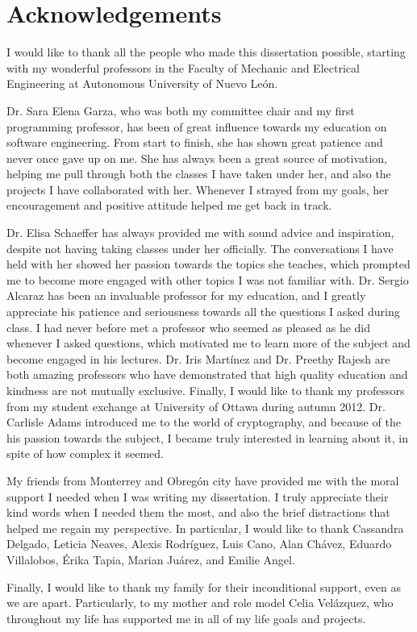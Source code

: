 \chapter*{Acknowledgements}

I would like to thank all the people who made this dissertation possible, starting with my wonderful professors in the Faculty of Mechanic and Electrical Engineering at Autonomous University of Nuevo Le\'{o}n. 

Dr. Sara Elena Garza, who was both my committee chair and my first programming professor, has been of great influence towards my education on software engineering. From start to finish, she has shown great patience and never once gave up on me. She has always been a great source of motivation, helping me pull through both the classes I have taken under her, and also the projects I have collaborated with her. Whenever I strayed from my goals, her encouragement and positive attitude helped me get back in track. 

Dr. Elisa Schaeffer has always provided me with sound advice and inspiration, despite not having taking classes under her officially. The conversations I have held with her showed her passion towards the topics she teaches, which prompted me to become more engaged with other topics I was not familiar with. Dr. Sergio Alcaraz has been an invaluable professor for my education, and I greatly appreciate his patience and seriousness towards all the questions I asked during class. I had never before met a professor who seemed as pleased as he did whenever I asked questions, which motivated me to learn more of the subject and become engaged in his lectures. Dr. Iris Mart\'{i}nez and Dr. Preethy Rajesh are both amazing professors who have demonstrated that high quality education and kindness are not mutually exclusive. Finally, I would like to thank my professors from my student exchange at University of Ottawa during autumn 2012. Dr. Carlisle Adams introduced me to the world of cryptography, and because of the his passion towards the subject, I became truly interested in learning about it, in spite of how complex it seemed.

My friends from Monterrey and Obreg\'{o}n city have provided me with the moral support I needed when I was writing my dissertation. I truly appreciate their kind words when I needed them the most, and also the brief distractions that helped me regain my perspective. In particular, I would like to thank Cassandra Delgado, Leticia Neaves, Alexis Rodr\'{i}guez, Luis Cano, Alan Ch\'{a}vez, Eduardo Villalobos, \'{E}rika Tapia, Marian Ju\'{a}rez, and Emilie Angel.

Finally, I would like to thank my family for their inconditional support, even as we are apart. Particularly, to my mother and role model Celia Vel\'{a}zquez, who throughout my life has supported me in all of my life goals and projects. 

\newpage

